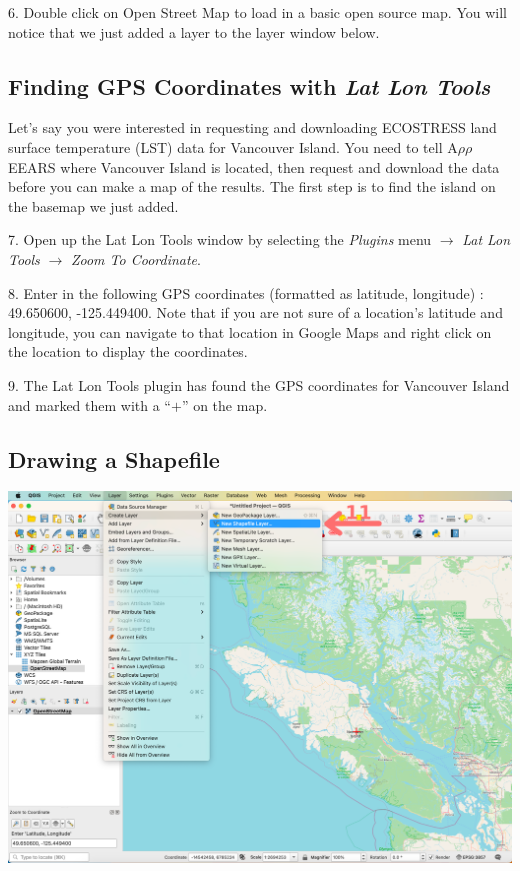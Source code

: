 \documentclass[oneside,a4paper,11pt,explicit]{book}
\begin{document}
	6. Double click on Open Street Map to load in a basic open source map. You will notice that we just added a layer to the layer window below.
	
	\subsection{Finding GPS Coordinates with \textit{Lat Lon Tools}}
	
	Let's say you were interested in requesting and downloading ECOSTRESS land surface temperature (LST) data for Vancouver Island. You need to tell A$\rho\rho$EEARS where Vancouver Island is located, then request and download the data before you can make a map of the results. The first step is to find the island on the basemap we just added.
	
	7. Open up the Lat Lon Tools window by selecting the \textit{Plugins} menu $\rightarrow$ \textit{Lat Lon Tools} $\rightarrow$ \textit{Zoom To Coordinate}.
	
	8. Enter in the following GPS coordinates (formatted as latitude, longitude) : 49.650600, -125.449400. Note that if you are not sure of a location's latitude and longitude, you can navigate to that location in Google Maps and right click on the location to display the coordinates. 
	
	9. The Lat Lon Tools plugin has found the GPS coordinates for Vancouver Island and marked them with a ``$+$'' on the map. 
	
	\subsection{Drawing a Shapefile}
	
	\centerline{\includegraphics[width=.9\textwidth]{CreateLayer.png}}
	
\end{document}
